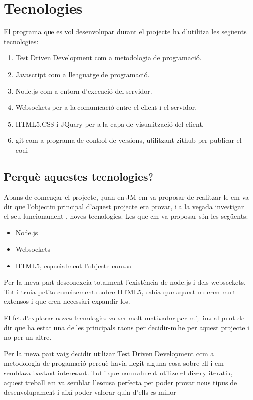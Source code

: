 \chapter{Tecnologies}
\label{sec:tecnologies}

El programa que es vol desenvolupar durant el projecte ha d'utilitza les següents tecnologies: 

\begin{enumerate}
	\item{Test Driven Development com a metodologia de programació.}
	\item{Javascript com a llenguatge de programació.}
	\item{Node.js com a entorn d'execució del servidor. }
	\item{Websockets per a la comunicació entre el client i el servidor.}
	\item{HTML5,CSS i JQuery per a la capa de visualització del client.}
	\item{git com a programa de control de versions, utilitzant github per publicar el codi}
\end{enumerate}

\section{Perquè aquestes tecnologies?}

Abans de començar el projecte, quan en JM em va proposar de realitzar-lo em va dir que l'objectiu principal d'aquest projecte era provar, i a la vegada investigar el seu funcionament , noves tecnologies. Les que em va proposar són les següents: 
\begin{itemize}
	\item{Node.js}
	\item{Websockets}
	\item{HTML5, especialment l'objecte canvas}
\end{itemize}

Per la meva part desconexeia totalment l'existència de node.js i dels websockets. Tot i tenia petits coneixements sobre HTML5, sabia que aquest no eren molt extensos i que eren necessàri expandir-los.

El fet d'explorar noves tecnologies va ser molt motivador per mí, fins al punt de dir que ha estat una de les principals raons per decidir-m'he per aquest projecte i no per un altre. 

Per la meva part vaig decidir utilizar Test Driven Development com a metodologia de progamació perquè havia llegit alguna cosa sobre ell i em semblava bastant interesant. Tot i que normalment utilizo el diseny iteratiu, aquest treball em va semblar l'escusa perfecta per poder provar nous tipus de desenvolupament i així poder valorar quin d'ells és millor. 

